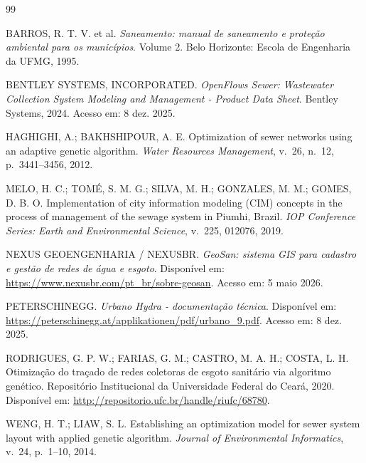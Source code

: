 \documentclass[12pt,a4paper]{article}
\begin{document}
\begin{thebibliography}{99}

BARROS, R. T. V. et al. \textit{Saneamento: manual de saneamento e proteção ambiental para os municípios}. Volume 2. Belo Horizonte: Escola de Engenharia da UFMG, 1995.

BENTLEY SYSTEMS, INCORPORATED. \textit{OpenFlows Sewer: Wastewater Collection System Modeling and Management - Product Data Sheet}. Bentley Systems, 2024. Acesso em: 8 dez. 2025.

HAGHIGHI, A.; BAKHSHIPOUR, A. E. Optimization of sewer networks using an adaptive genetic algorithm. \textit{Water Resources Management}, v.~26, n.~12, p.~3441--3456, 2012.

MELO, H. C.; TOMÉ, S. M. G.; SILVA, M. H.; GONZALES, M. M.; GOMES, D. B. O. Implementation of city information modeling (CIM) concepts in the process of management of the sewage system in Piumhi, Brazil. \textit{IOP Conference Series: Earth and Environmental Science}, v.~225, 012076, 2019.

NEXUS GEOENGENHARIA / NEXUSBR. \textit{GeoSan: sistema GIS para cadastro e gestão de redes de água e esgoto}. Disponível em: \url{https://www.nexusbr.com/pt_br/sobre-geosan}. Acesso em: 5 maio 2026.

PETERSCHINEGG. \textit{Urbano Hydra - documentação técnica}. Disponível em: \url{https://peterschinegg.at/applikationen/pdf/urbano_9.pdf}. Acesso em: 8 dez. 2025.

RODRIGUES, G. P. W.; FARIAS, G. M.; CASTRO, M. A. H.; COSTA, L. H. Otimização do traçado de redes coletoras de esgoto sanitário via algoritmo genético. Repositório Institucional da Universidade Federal do Ceará, 2020. Disponível em: \url{http://repositorio.ufc.br/handle/riufc/68780}.

WENG, H. T.; LIAW, S. L. Establishing an optimization model for sewer system layout with applied genetic algorithm. \textit{Journal of Environmental Informatics}, v.~24, p.~1--10, 2014.

\end{thebibliography}
\end{document}

